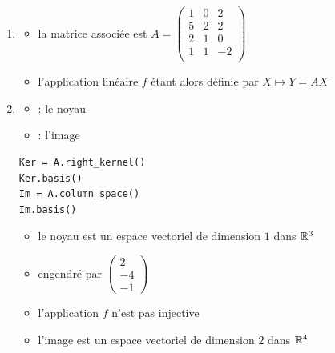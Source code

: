 \begin{frame}[fragile]

\begin{enumerate}
  \item 
  \begin{itemize}
    \item la matrice associée est $A = \left(\begin{smallmatrix}1&0&2\\5&2&2\\2&1&0\\1&1&-2\\\end{smallmatrix}\right)$
    \pause
    \item l'application linéaire $f$ étant alors définie par $X \mapsto Y = AX$
  \end{itemize}

  
 \pause
  \item %
  \begin{itemize}
    \item {} : le noyau
    \pause
    \item {} : l'image
  \end{itemize}    
    
 \vspace*{-1ex} 
\pause

 {\small   
\begin{algo}
\begin{lstlisting}
Ker = A.right_kernel()
Ker.basis()
Im = A.column_space()
Im.basis()
\end{lstlisting}
\end{algo}   
} 

\vspace*{-1ex}
\pause
  \begin{itemize}
    \item le noyau est un espace vectoriel de dimension $1$ dans $\mathbb{R}^3$ 
    \pause
    \item engendré par $\left(\begin{smallmatrix}2\\-4\\-1\end{smallmatrix}\right)$ 
    \pause
    \item l'application $f$ n'est pas injective
  \pause
    \item l'image est un espace vectoriel de dimension $2$ dans $\mathbb{R}^4$
    \pause
    

\end{itemize}
\end{enumerate}
\end{frame}
